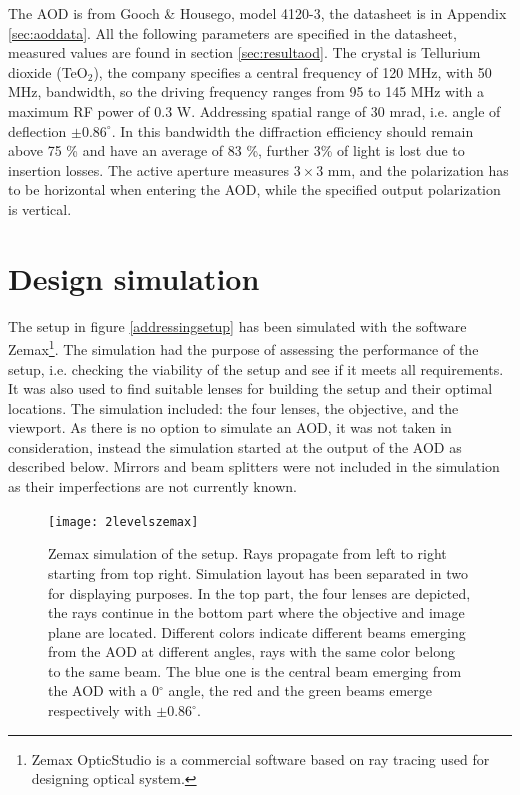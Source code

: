The AOD is from Gooch \& Housego, model 4120-3, the datasheet is in Appendix \ref{sec:aoddata}. All the following parameters are specified in the datasheet, measured values are found in section \ref{sec:resultaod}. The crystal is Tellurium dioxide (TeO$_2$), the company specifies a central frequency of 120 MHz, with 50 MHz, bandwidth, so the driving frequency ranges from 95 to 145 MHz with a maximum RF power of 0.3 W. Addressing spatial range of 30 mrad, i.e. angle of deflection $\pm 0.86^{\circ}$. In this bandwidth the diffraction efficiency should remain above 75 \% and have an average of 83 \%, further 3\% of light is lost due to insertion losses. The active aperture measures $3\times 3$ mm, and the polarization has to be horizontal when entering the AOD, while the specified output polarization is vertical.

\section{Design simulation}
The setup in figure \ref{addressingsetup} has been simulated with the software Zemax\footnote{Zemax OpticStudio is a commercial software based on ray tracing used for designing optical system.}. The simulation had the purpose of assessing the performance of the setup, i.e. checking the viability of the setup and see if it meets all requirements. It was also used to find suitable lenses for building the setup and their optimal locations. The simulation included: the four lenses, the objective, and the viewport. As there is no option to simulate an AOD, it was not taken in consideration, instead the simulation started at the output of the AOD as described below. Mirrors and beam splitters were not included in the simulation as their imperfections are not currently known.
\begin{figure}[H]
\centering
\texttt{[image: 2levelszemax]}
\caption{Zemax simulation of the setup. Rays propagate from left to right starting from top right. Simulation layout has been separated in two for displaying purposes. In the top part, the four lenses are depicted, the rays continue in the bottom part where the objective and image plane are located. Different colors indicate different beams emerging from the AOD at different angles, rays with the same color belong to the same beam. The blue one is the central beam emerging from the AOD with a 0$^\circ$ angle, the red and the green beams emerge respectively with $\pm0.86^\circ$.}
\label{zemaxview}
\end{figure}
